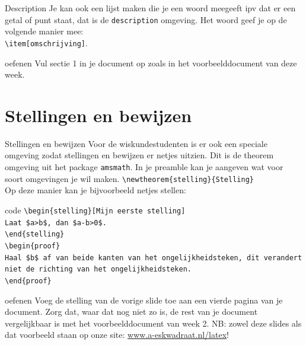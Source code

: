 \documentclass{beamer}
\begin{document}
\begin{frame}{Description}
	Je kan ook een lijst maken die je een woord meegeeft ipv dat er een getal of punt staat, dat is de \texttt{description} omgeving. Het woord geef je op de volgende manier mee:\\
	\texttt{\textbackslash item[omschrijving]}.
\end{frame}

\begin{frame}{oefenen}
	Vul sectie 1 in je document op zoals in het voorbeelddocument van deze week.
\end{frame}

\section{Stellingen en bewijzen}
\begin{frame}[allowframebreaks]{Stellingen en bewijzen}
	Voor de wiskundestudenten is er ook een speciale omgeving zodat stellingen en bewijzen er netjes uitzien.
	Dit is de theorem omgeving uit het package \texttt{amsmath}.
	In je preamble kan je aangeven wat voor soort omgevingen je wil maken.
	\texttt{\textbackslash newtheorem\{stelling\}\{Stelling\}}\\
	\framebreak
	Op deze manier kan je bijvoorbeeld netjes stellen:
	\begin{block}{code}
		\texttt{\textbackslash begin\{stelling\}[Mijn eerste stelling]\\
			Laat \$a>b\$, dan \$a-b>0\$.\\
			\textbackslash end\{stelling\}\\
			\textbackslash begin\{proof\}\\
				Haal \$b\$ af van beide kanten van het ongelijkheidsteken, dit verandert niet de richting van het ongelijkheidsteken.\\
			\textbackslash end\{proof\}}
	\end{block}
\end{frame}

\begin{frame}{oefenen}
	Voeg de stelling van de vorige slide toe aan een vierde pagina van je document. Zorg dat, waar dat nog niet zo is, de rest van je document vergelijkbaar is met het voorbeelddocument van week 2.
	\vfill
	NB: zowel deze slides als dat voorbeeld staan op onze site: \url{www.a-eskwadraat.nl/latex}!
\end{frame}
\end{document}
